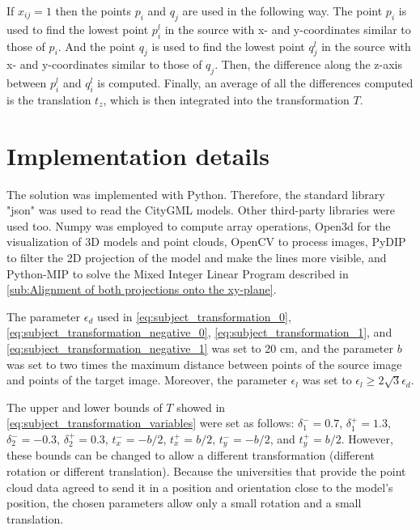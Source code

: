             If $x_{ij} = 1$ then the points $p_i$ and $q_j$ are used in the following way.
            The point $p_i$ is used to find the lowest point $p_i^l$ in the source with x- and y-coordinates similar to those of $p_i$.
            And the point $q_j$ is used to find the lowest point $q_j^l$ in the source with x- and y-coordinates similar to those of $q_j$.
            Then, the difference along the z-axis between $p_i^l$ and $q_i^l$ is computed.
            Finally, an average of all the differences computed is the translation $t_z$, which is then integrated into the transformation $T$.

    \section{Implementation details}
        The solution was implemented with Python. Therefore, the standard library "json" was used to read the CityGML models.
        Other third-party libraries were used too. Numpy \cite{harris_2020_numpy} was employed to compute array operations, 
        Open3d \cite{Zhou_2018_open3d} for the visualization of 3D models and point clouds, 
        OpenCV \cite{opencv_library} to process images, PyDIP to filter the 2D projection of the model and make the lines more visible, 
        and Python-MIP \cite{pythonMIP_library} to solve the Mixed Integer Linear Program described in \autoref{sub:Alignment of both projections onto the xy-plane}.
        
        The parameter $\epsilon_d$ used in \autoref{eq:subject_transformation_0}, \autoref{eq:subject_transformation_negative_0}, \autoref{eq:subject_transformation_1}, and \autoref{eq:subject_transformation_negative_1}
        was set to 20 cm, and the parameter $b$ was set to two times the maximum distance between points of the source image and points of the target image.
        Moreover, the parameter $\epsilon_l$ was set to $\epsilon_l \geq 2 \sqrt{3} \epsilon_d$. 
        
        The upper and lower bounds of $T$ showed in \autoref{eq:subject_transformation_variables} were set as follows: 
        $\delta_1^- = 0.7$, $\delta_1^+ = 1.3$, $\delta_2^- = -0.3$, $\delta_2^+ = 0.3$, $t_x^- = -b / 2$, $t_x^+ = b / 2$, $t_y^- = -b / 2$, and $t_y^+ = b / 2$.
        However, these bounds can be changed to allow a different transformation (different rotation or different translation).
        Because the universities that provide the point cloud data agreed to send it in a position and orientation close to the model’s position, 
        the chosen parameters allow only a small rotation and a small translation.


